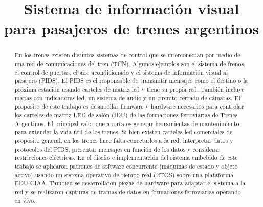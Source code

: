 \documentclass[conference]{IEEEtran}
\begin{document}
\title{Sistema de información visual \\para pasajeros de trenes argentinos}


\author{
\and
{}
}



\maketitle

\begin{abstract}
En los trenes existen distintos sistemas de control que se interconectan por medio de una red de comunicaciones del tren (TCN). Algunos ejemplos son el sistema de frenos, el control de puertas, el aire acondicionado y el sistema de información visual al pasajero (PIDS). El PIDS es el responsable de transmitir mensajes como el destino o la próxima estación usando carteles de matriz led y tiene su propia red. También incluye mapas con indicadores led, un sistema de audio y un circuito cerrado de cámaras. El propósito de este trabajo es desarrollar firmware y hardware necesarios para controlar los carteles de matriz LED de salón (IDU) de las formaciones ferroviarias de Trenes Argentinos. El principal valor que aporta es generar herramientas de mantenimiento para extender la vida útil de los trenes. Si bien existen carteles led comerciales de propósito general, en los trenes hace falta conectarlos a la red, interpretar datos y protocolos del PIDS, presentar mensajes en función de los datos y considerar restricciones eléctricas. En el diseño e implementación del sistema embebido de este trabajo se aplicaron patrones de software concurrente (máquinas de estado y objeto activo) usando un sistema operativo de tiempo real (RTOS) sobre una plataforma EDU-CIAA. También se desarrollaron piezas de hardware para adaptar el sistema a la red y se realizaron capturas de tramas de datos en formaciones ferroviarias operando en vivo.\\

\end{abstract}
\end{document}
